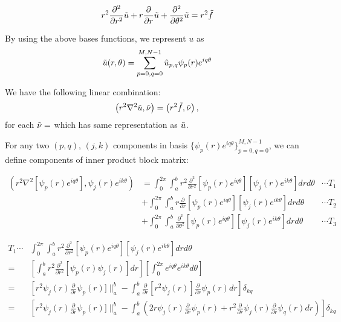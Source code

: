 \documentclass[11pt,letterpaper]{article}
\begin{document}
\begin{equation}
r^2 \frac{\partial^2}{\partial r^2} \Tilde{u} + r
\frac{\partial}{\partial r} \Tilde{u} + \frac{\partial^2}{\partial
\theta^2} \Tilde{u} = r^2 \Tilde{f}
\end{equation}

 By using the above bases functions, we represent $u$ as
\begin{align}
\Tilde{u}(r, \theta) =
\sum_{p=0,q=0}^{M,N-1}\Hat{u}_{p,q}\psi_p(r) e^{iq\theta} \\
\end{align}

We have the following linear combination:
\begin{equation}
\left(r^2 \nabla^2 \Tilde{u}, \Tilde{\nu} \right) =
\left(r^2 \Tilde{f}, \Tilde{\nu}\right),
\end{equation}
for each $\Tilde{\nu} = $ which has same representation as
$\Tilde{u}$.

For any two $(p,q)$, $(j,k)$ components in basis $\{\psi_p(r)
e^{iq\theta}\}_{p=0, q=0}^{M, N-1}$, we can define components of
inner product block matrix:


\begin{align*}
\left( r^2 \nabla^2 \left[ \psi_p(r) e^{iq\theta} \right],
\psi_j(r)e^{ik\theta} \right)
& =\int_{0}^{2\pi}\int_{a}^{b}
r^2\frac{\partial^2}{\partial r^2} \left[ \psi_p(r)
e^{iq\theta}\right]
\left[ \psi_j(r)e^{ik\theta} \right] dr d\theta &\cdots T_1\\
& + \int_{0}^{2\pi}\int_{a}^{b} r\frac{\partial}{\partial r}\left[
\psi_p(r) e^{iq\theta}\right]
\left[ \psi_j(r)e^{ik\theta}\right] dr d\theta  &\cdots T_2\\
& + \int_{0}^{2\pi}\int_{a}^{b} \frac{\partial^2}{\partial
\theta^2} \left[ \psi_p(r) e^{iq\theta}\right] \left[
\psi_j(r)e^{ik\theta}\right] dr d\theta         &\cdots T_3
\end{align*}
\newline

\begin{align*}
T_1\cdots & \int_{0}^{2\pi}\int_{a}^{b}
r^2\frac{\partial^2}{\partial r^2} \left[ \psi_p(r)
e^{iq\theta}\right]
\left[ \psi_j(r)e^{ik\theta} \right] dr d\theta \\
=& \left[ \int_{a}^{b}r^2\frac{\partial^2}{\partial r^2} \left[
\psi_p(r) \psi_j(r) \right] dr \right] \left[ \int_{0}^{2\pi}
e^{iq\theta}e^{ik\theta}d\theta \right] \\
=& \left[ r^2 \psi_j(r)\frac{\partial}{\partial r} \psi_p(r)
]\|_{a}^{b} - \int_{a}^{b}\frac{\partial}{\partial r}\left[ r^2
\psi_j(r)\right] \frac{\partial}{\partial r} \psi_p(r) dr \right]
\delta_{kq} \\
=& \left[ r^2 \psi_j(r)\frac{\partial}{\partial r} \psi_p(r)
]\|_{a}^{b} - \int_{a}^{b} ( 2r \psi_j(r) \frac{\partial}{\partial
r} \psi_p(r) + r^2\frac{\partial}{\partial r} \psi_j(r)
\frac{\partial}{\partial r} \psi_q(r)dr )\right] \delta_{kq}
\end{align*}
\end{document}
